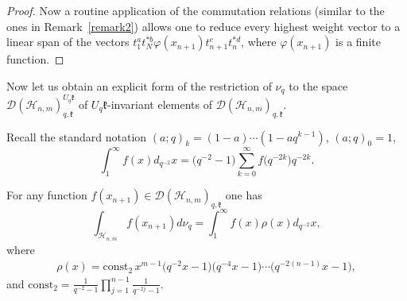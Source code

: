 \documentclass[pdftex]{sigma}
\begin{document}
\begin{proof}
Now a routine application of the commutation relations (similar to the ones in Remark~\ref{remark2}) allows one to reduce
every highest weight vector to a linear span of the vectors $t_1^at_N^{*b}\varphi(x_{n+1})t_{n+1}^ct_n^{*d}$,
where $\varphi(x_{n+1})$ is a f\/inite function.
\end{proof}



Now let us obtain an explicit form of the restriction of $\nu_q$ to the space
$\mathscr{D}(\mathscr{H}_{n,m})_{q,\mathfrak{k}}^{U_q \mathfrak{k}}$ of $U_q \mathfrak{k}$-invariant elements
of $\mathscr{D}(\mathscr{H}_{n,m})_{q,\mathfrak{k}}$.

Recall the standard notation $(a;q)_k=(1-a)\cdots (1-aq^{k-1})$, $(a;q)_0=1$,
\[
\int_{1}^\infty f(x) d_{q^{-2}}x=\big(q^{-2}-1\big)\sum_{k=0}^\infty f\big(q^{-2k}\big)q^{-2k}.
\]

\begin{proposition}\label{rad_int}
For any function $f(x_{n+1}) \in \mathscr{D}(\mathscr{H}_{n,m})_{q,\mathfrak{k}}$ one has
\[
\int_{\mathscr{H}_{n,m}} f(x_{n+1}) d\nu_q= \int_1^\infty f(x)\rho(x) d_{q^{-2}}x,
\]
where
\begin{gather}\label{rho_x}
\rho(x)=\mathrm{const_2}\,   x^{m-1}\big(q^{-2}x-1\big)\big(q^{-4}x-1\big)\cdots \big(q^{-2(n-1)}x-1\big),
\end{gather}
and $\mathrm{const_2}=\frac{1}{q^{-2}-1}\prod \limits_{j=1}^{n-1}\frac{1}{q^{-2j}-1}.$
\end{proposition}
\end{document}
